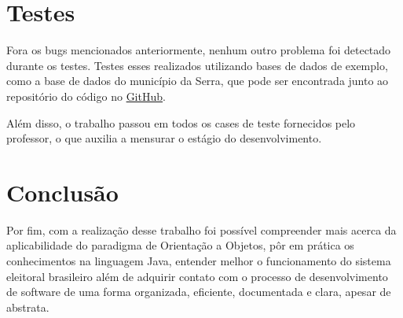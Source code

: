 \documentclass[
		12pt, %
		oneside, %
		a4paper, %
		article, %
		chapter=TITLE, %
		section=TITLE, %
		subsection=TITLE, %
		english, %
		spanish, %
		brazil %
]{abntex2} %
\numberwithin{equation}{section}
\numberwithin{figure}{section}
\numberwithin{table}{section}
\begin{document}
	\section{Testes}

        Fora os bugs mencionados anteriormente, nenhum outro problema foi detectado durante os testes. Testes esses realizados utilizando bases de dados de exemplo, como a base de dados do município da Serra, que pode ser encontrada junto ao repositório do código no \href{https://github.com/AlvaroDavi5/Brazilian_Electoral_System}{GitHub}.

        Além disso, o trabalho passou em todos os cases de teste fornecidos pelo professor, o que auxilia a mensurar o estágio do desenvolvimento.

    \newpage

	\section{Conclusão}

        Por fim, com a realização desse trabalho foi possível compreender mais acerca da aplicabilidade do paradigma de Orientação a Objetos, pôr em prática os conhecimentos na linguagem Java, entender melhor o funcionamento do sistema eleitoral brasileiro além de adquirir contato com o processo de desenvolvimento de software de uma forma organizada, eficiente, documentada e clara, apesar de abstrata.
\end{document}
